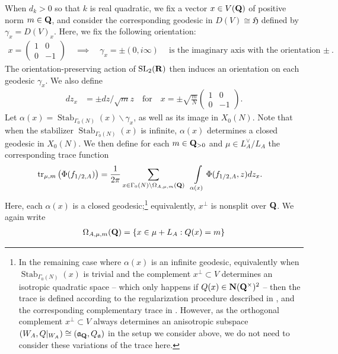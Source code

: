 \documentclass{amsart}
\theoremstyle{definition}
\theoremstyle{definition}
\theoremstyle{definition}
\begin{document}
When $d_k >0$ so that $k$ is real quadratic, we fix a vector $x \in V({\bf{Q}})$ of positive norm $m \in {\bf{Q}}$, and consider 
the corresponding geodesic in $D(V) \cong \mathfrak{H}$ defined by $\gamma_x = D(V)_x$. Here, we fix the following orientation:
\begin{align*} x = \left( \begin{array}{cc} 1 & 0 \\ 0 & -1\end{array} \right) \quad \implies \quad \gamma_x = \pm (0, i \infty) \quad
\text{is the imaginary axis with the orientation $\pm$}. \end{align*}
The orientation-preserving action of $\operatorname{SL}_2({\bf{R}})$ then induces an orientation on each geodesic $\gamma_x$. We also define
\begin{align*} d z_x 
&= \pm dz/\sqrt{m} z \quad \text{for} \quad x = \pm \sqrt{\frac{m}{N}}  \left( \begin{array}{cc} 1 & 0 \\ 0 & -1\end{array} \right). \end{align*}
Let $\alpha(x) = \operatorname{Stab}_{\Gamma_0(N)}(x) \backslash \gamma_x$, as well as its image in $X_0(N)$. Note that when
the stabilizer $\operatorname{Stab}_{\Gamma_0(N)}(x)$ is infinite, $\alpha(x)$ determines a closed geodesic in $X_0(N)$. 
We then define for each $m \in {\bf{Q}}_{>0}$ and $\mu \in L_A^{\vee}/L_A$ the corresponding trace function 
\begin{align*} \operatorname{tr}_{\mu, m}\left( \Phi(f_{1/2, A}) \right)  
&=  \frac{1}{2 \pi} \sum\limits_{ x \in \Gamma_0(N) \backslash \Omega_{A, \mu, m}({\bf{Q}}) } ~~ \int\limits_{\alpha(x)} \Phi(f_{1/2, A}, z) dz_x. \end{align*}
Here, each $\alpha(x)$ is a closed geodesic;\footnote{In the remaining case where $\alpha(x)$ is an infinite geodesic, equivalently 
when $\operatorname{Stab}_{\Gamma_0(N)}(x)$ is trivial and the complement $x^{\perp} \subset V$
determines an isotropic quadratic space -- which only happens if $Q(x) \in {\bf{N}}({\bf{Q}}^{\times})^2$ -- then the trace 
is defined according to the regularization procedure described in \cite[$\S$3.3]{BFI}, and the corresponding complementary trace in \cite[$\S$3.3.2]{BFI}.
However, as the orthogonal complement $x^{\perp} \subset V$ always determines an anisotropic subspace
$(W_A, Q\vert_{W_A}) \cong (\mathfrak{a}_{\bf{Q}}, Q_{\mathfrak{a}})$ in the setup we consider above, we do not need to consider these variations of the trace here.}
equivalently, $x^{\perp}$ is nonsplit over ${\bf{Q}}$. We again write
\begin{align*} \Omega_{A, \mu, m}({\bf{Q}}) = \left\lbrace x \in \mu + L_A: Q(x)=m \right\rbrace \end{align*}  
\end{document}
